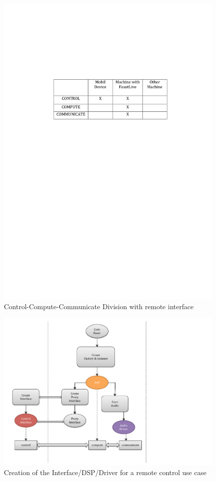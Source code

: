 \documentclass[a4paper]{article}
\begin{document}
\begin{figure}[!h]
\begin{center}
\includegraphics[width=0.7\columnwidth]{images/2CCC}
\caption{Control-Compute-Communicate Division with remote interface}
\label{fig:2CCC}
\end{center}
\end{figure}
\begin{figure}[!h]
\begin{center}
\includegraphics[width=\columnwidth]{images/CCC2}
\caption{Creation of the Interface/DSP/Driver for a remote control use case}
\label{fig:CCC2}
\end{center}
\end{figure}
\end{document}
